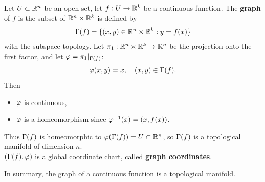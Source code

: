 \begin{example}
    Let $U \subset \mathbb{R}^n$ be an open set, let $f:U \to \mathbb{R}^k$ be a continuous function. The \textbf{graph} of $f$ is the subset of $\mathbb{R}^n \times \mathbb{R}^k$ is defined by 
    $$\Gamma(f) = \{(x,y) \in \mathbb{R}^n \times \mathbb{R}^k: y = f(x)\}$$
    with the subspace topology. 
    Let $\pi_1: \mathbb{R}^n \times \mathbb{R}^k \to \mathbb{R}^n$ be the projection onto the first factor, and let $\varphi = \pi_1|_{\Gamma(f)}$:
    $$\varphi(x,y) = x, \quad (x,y) \in \Gamma(f). $$
    Then
    \begin{itemize}
        \item $\varphi$ is continuous, 
        \item $\varphi$ is a homeomorphism since $\varphi^{-1}(x) = (x,f(x))$. 
    \end{itemize}
    Thus $\Gamma(f)$ is homeomorphic to $\varphi(\Gamma(f)) = U \subset \mathbb{R}^n$, 
    so $\Gamma(f)$ is a topological manifold of dimension $n$. \\
    $(\Gamma(f), \varphi)$ is a global coordinate chart, called \textbf{graph coordinates}. 

    In summary, the graph of a continuous function is a topological manifold. 
\end{example}
